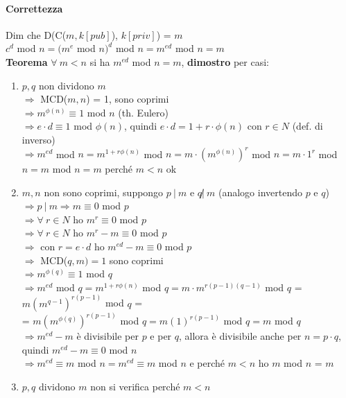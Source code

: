 \documentclass[10pt]{book}
\begin{document}
\paragraph{Correttezza} Dim che D(C($m, k[pub]$), $k[priv]$) = $m$\\
$c^d$ mod $n = (m^e$ mod $n)^d$ mod $n = m ^{ed}$ mod $n = m$\\
\textbf{Teorema} $\forall\:m<n$ si ha $m^{ed}$ mod $n = m$, \textbf{dimostro} per casi:
\begin{enumerate}
	\item $p,q$ non dividono $m$\\
	$\Rightarrow$ MCD($m, n$) = 1, sono coprimi\\
	$\Rightarrow m^{\phi(n)} \equiv 1$ mod $n$ (th. Eulero)\\
	$\Rightarrow e\cdot d \equiv 1$ mod $\phi(n)$, quindi $e\cdot d = 1 + r\cdot\phi(n)$ con $r\in N$ (def. di inverso)\\
	$\Rightarrow m^{ed}$ mod $n = m^{1 + r\phi(n)}$ mod $n = m\cdot \left(m^{\phi(n)}\right)^r$ mod $n = m\cdot 1^r$ mod $n = m$ mod $n = m$ perché $m < n$ ok
	\item $m,n$ non sono coprimi, suppongo $p\:|\:m$ e $q\not|\:m$ (analogo invertendo $p$ e $q$)\\
	$\Rightarrow p\:|\:m \Rightarrow m \equiv 0$ mod $p$\\
	$\Rightarrow \forall\:r\in N$ ho $m^r\equiv 0$ mod $p$\\
	$\Rightarrow \forall\:r\in N$ ho $m^r - m\equiv 0$ mod $p$\\
	$\Rightarrow$ con $r=e\cdot d$ ho $m^{ed} - m\equiv 0$ mod $p$\\
	$\Rightarrow$ MCD($q, m) = 1$ sono coprimi\\
	$\Rightarrow m^{\phi(q)} \equiv 1$ mod $q$\\
	$\Rightarrow m^{ed}$ mod $q = m^{1 + r\phi(n)}$ mod $q = m\cdot m^{r(p-1)(q-1)}$ mod $q$ = $m\left(m^{q-1}\right)^{r(p-1)}$ mod $q$ =\\= $m\left(m^{\phi(q)}\right)^{r(p-1)}$ mod $q = m(1)^{r(p-1)}$ mod $q = m$ mod $q$\\
	$\Rightarrow m^{ed} - m$ è divisibile per $p$ e per $q$, allora è divisibile anche per $n = p\cdot q$, quindi $m^{ed} - m \equiv 0$ mod $n$\\
	$\Rightarrow m^{ed}\equiv m$ mod $n = m^{ed}\equiv m$ mod $n$ e perché $m < n$ ho $m$ mod $n$ = $m$
	\item $p, q$ dividono $m$ non si verifica perché $m < n$
\end{enumerate}
\end{document}
